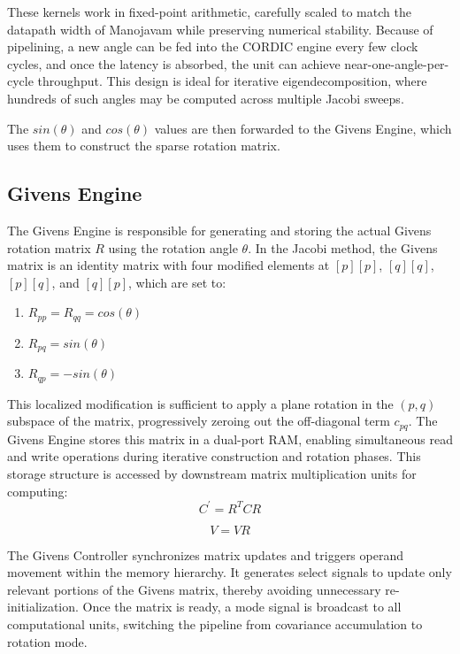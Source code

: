 These kernels work in fixed-point arithmetic, carefully scaled to match the datapath width of Manojavam while preserving numerical stability. Because of pipelining, a new angle can be fed into the CORDIC engine every few clock cycles, and once the latency is absorbed, the unit can achieve near-one-angle-per-cycle throughput. This design is ideal for iterative eigendecomposition, where hundreds of such angles may be computed across multiple Jacobi sweeps.

The $sin(\theta)$ and $cos(\theta)$ values are then forwarded to the Givens Engine, which uses them to construct the sparse rotation matrix.

\subsection{Givens Engine}
The Givens Engine is responsible for generating and storing the actual Givens rotation matrix $R$ using the rotation angle $\theta$. In the Jacobi method, the Givens matrix is an identity matrix with four modified elements at $[p][p]$, $[q][q]$, $[p][q]$, and $[q][p]$, which are set to:
\begin{enumerate}
	\item $R_{pp} = R_{qq} = cos(\theta)$
	\item $R_{pq} = sin(\theta)$
	\item $R_{qp} = -sin(\theta)$
\end{enumerate}

This localized modification is sufficient to apply a plane rotation in the $(p,q)$ subspace of the matrix, progressively zeroing out the off-diagonal term $c_{pq}$. The Givens Engine stores this matrix in a dual-port RAM, enabling simultaneous read and write operations during iterative construction and rotation phases. This storage structure is accessed by downstream matrix multiplication units for computing:
\begin{equation}
	C^{'} = R^{T}CR
\end{equation}

\begin{equation}
	V = VR
\end{equation}

The Givens Controller synchronizes matrix updates and triggers operand movement within the memory hierarchy. It generates select signals to update only relevant portions of the Givens matrix, thereby avoiding unnecessary re-initialization. Once the matrix is ready, a mode signal is broadcast to all computational units, switching the pipeline from covariance accumulation to rotation mode.

